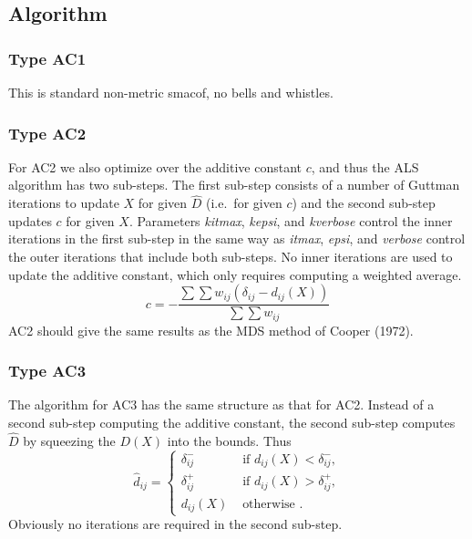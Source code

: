 \documentclass[
  12pt,
]{article}
\begin{document}
\subsection{Algorithm}\label{algorithm}

\subsubsection{Type AC1}\label{type-ac1}

This is standard non-metric smacof, no bells and whistles.

\subsubsection{Type AC2}\label{type-ac2}

For AC2 we also optimize over the additive constant \(c\), and thus the ALS algorithm has two
sub-steps. The first sub-step consists of a number of Guttman iterations to update \(X\) for given
\(\hat D\) (i.e.~for given \(c\)) and the second sub-step updates \(c\) for given \(X\).
Parameters \emph{kitmax}, \emph{kepsi}, and \emph{kverbose} control the inner iterations in the first sub-step in the same way as \emph{itmax}, \emph{epsi}, and \emph{verbose} control the
outer iterations that include both sub-steps. No inner iterations are used
to update the additive constant, which only requires computing a weighted
average.
\begin{equation}
c=-\frac{\sum\sum w_{ij}(\delta_{ij}-d_{ij}(X))}{\sum\sum w_{ij}}
\label{eq:updac2}
\end{equation}
AC2 should give the same results as the MDS method of Cooper (1972).

\subsubsection{Type AC3}\label{type-ac3}

The algorithm for AC3 has the same structure as that for AC2. Instead of
a second sub-step computing the additive constant, the second sub-step
computes \(\hat D\) by squeezing the \(D(X)\) into the bounds. Thus
\begin{equation}
\hat d_{ij}=\begin{cases}
\delta_{ij}^-&\text{ if }d_{ij}(X)<\delta_{ij}^-,\\
\delta_{ij}^+&\text{ if }d_{ij}(X)>\delta_{ij}^+,\\
d_{ij}(X)&\text{ otherwise }.
\end{cases}
\label{eq:updac3}
\end{equation}
Obviously no iterations are required in the second sub-step.
\end{document}
